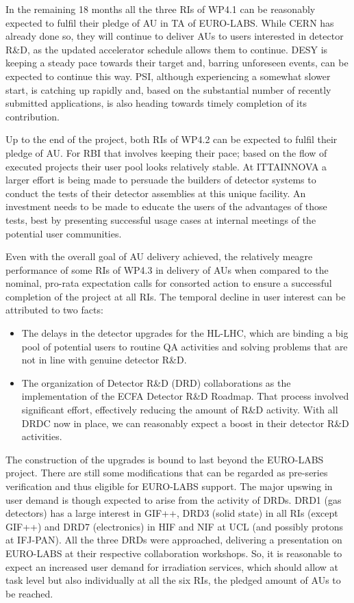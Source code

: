 In the remaining 18 months all the three RIs of WP4.1 can be reasonably expected to fulfil their pledge of AU in TA of EURO-LABS. While CERN has already done so, they will continue to deliver AUs to users interested in detector R\&D, as the updated accelerator schedule allows them to continue. DESY is keeping a steady pace towards their target and, barring unforeseen events, can be expected to continue this way. PSI, although experiencing a somewhat slower start, is catching up rapidly and, based on the substantial number of recently submitted applications, is also heading towards timely completion of its contribution.

Up to the end of the project, both RIs of WP4.2 can be expected to fulfil their pledge of AU. For RBI that involves keeping their pace; based on the flow of executed projects their user pool looks relatively stable. At ITTAINNOVA a larger effort is being made to persuade the builders of detector systems to conduct the tests of their detector assemblies at this unique facility. An investment needs to be made to educate the users of the advantages of those tests, best by presenting successful usage cases at internal meetings of the potential user communities.

Even with the overall goal of AU delivery achieved, the relatively meagre performance of some RIs of WP4.3 in delivery of AUs when compared to the nominal, pro-rata expectation calls for consorted action to ensure a successful completion of the project at all RIs. The temporal decline in user interest can be attributed to two facts: 
\begin{itemize}
\item The delays in the detector upgrades for the HL-LHC, which are binding a big pool of potential users to routine QA activities and solving problems that are not in line with genuine detector R\&D.
\item The organization of Detector R\&D (DRD) collaborations as the implementation of the ECFA Detector R\&D Roadmap. That process involved significant effort, effectively reducing the amount of R\&D activity. With all DRDC now in place, we can reasonably expect a boost in their detector R\&D activities. 
\end{itemize}
The construction of the upgrades is bound to last beyond the EURO-LABS project. There are still some modifications that can be regarded as pre-series verification and thus eligible for EURO-LABS support. The major upswing in user demand is though expected to arise from the activity of DRDs. DRD1 (gas detectors) has a large interest in GIF++, DRD3 (solid state) in all RIs (except GIF++) and DRD7 (electronics) in HIF and NIF at UCL (and possibly protons at IFJ-PAN). All the three DRDs were approached, delivering a presentation on EURO-LABS at their respective collaboration workshops. So, it is reasonable to expect an increased user demand for irradiation services, which should allow at task level but also individually at all the six RIs, the pledged amount of AUs to be reached.

